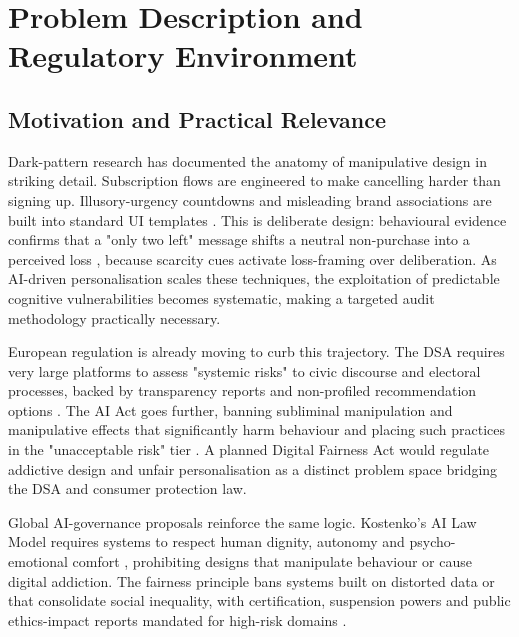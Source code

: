 \documentclass[11pt]{article}
\begin{document}
\newpage
{}
\setcounter{page}{1}


\section{Problem Description and Regulatory Environment}

\subsection{Motivation and Practical Relevance}
\label{sec:motivation_practical_relevance} Dark-pattern research has documented the anatomy of manipulative design in striking detail. Subscription flows are engineered to make cancelling harder than signing up. Illusory-urgency countdowns and misleading brand associations are built into standard UI templates \parencites[390]{7896734}. This is deliberate design: behavioural evidence confirms that a "only two left" message shifts a neutral non-purchase into a perceived loss \parencites[135]{8745065}, because scarcity cues activate loss-framing over deliberation. As AI-driven personalisation scales these techniques, the exploitation of predictable cognitive vulnerabilities becomes systematic, making a targeted audit methodology practically necessary.

European regulation is already moving to curb this trajectory. The DSA requires very large platforms to assess "systemic risks" to civic discourse and electoral processes, backed by transparency reports and non-profiled recommendation options \parencites[12]{6502223}[2]{9360054}. The AI Act goes further, banning subliminal manipulation and manipulative effects that significantly harm behaviour and placing such practices in the "unacceptable risk" tier \parencites[12]{6502223}[390]{7896734}. A planned Digital Fairness Act would regulate addictive design and unfair personalisation as a distinct problem space bridging the DSA and consumer protection law.

Global AI-governance proposals reinforce the same logic. Kostenko's AI Law Model requires systems to respect human dignity, autonomy and psycho-emotional comfort \parencites[61--62]{2977039}, prohibiting designs that manipulate behaviour or cause digital addiction. The fairness principle bans systems built on distorted data or that consolidate social inequality, with certification, suspension powers and public ethics-impact reports mandated for high-risk domains \parencites[73--74]{2977039}.
\end{document}
